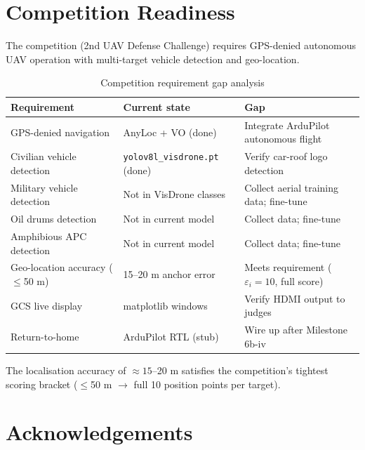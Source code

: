 \documentclass[11pt,a4paper]{article}
\begin{document}
\section{Competition Readiness}
\label{sec:competition}

The competition (2nd UAV Defense Challenge) requires GPS-denied autonomous UAV operation
with multi-target vehicle detection and geo-location.

\begin{table}[h]
\centering
\caption{Competition requirement gap analysis}
\begin{tabular}{@{}p{4cm}p{4cm}p{4.5cm}@{}}
\toprule
\textbf{Requirement} & \textbf{Current state} & \textbf{Gap}\\
\midrule
GPS-denied navigation & AnyLoc + VO (done) & Integrate ArduPilot autonomous flight\\
Civilian vehicle detection & \texttt{yolov8l\_visdrone.pt} (done) & Verify car-roof logo detection\\
Military vehicle detection & Not in VisDrone classes & Collect aerial training data; fine-tune\\
Oil drums detection & Not in current model & Collect data; fine-tune\\
Amphibious APC detection & Not in current model & Collect data; fine-tune\\
Geo-location accuracy ($\leq$50 m) & 15--20 m anchor error & Meets requirement ($\varepsilon_i = 10$, full score)\\
GCS live display & matplotlib windows & Verify HDMI output to judges\\
Return-to-home & ArduPilot RTL (stub) & Wire up after Milestone 6b-iv\\
\bottomrule
\end{tabular}
\end{table}

The localisation accuracy of $\approx15$--20 m satisfies the competition's tightest scoring
bracket ($\leq$50 m \ensuremath{\to} full 10 position points per target).

\section*{Acknowledgements}
\end{document}
